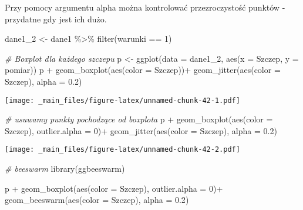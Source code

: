 \documentclass[
]{book}
\newenvironment{Shaded}{\begin{snugshade}}{\end{snugshade}}
\newcommand{\AttributeTok}[1]{\textcolor[rgb]{0.77,0.63,0.00}{#1}}
\newcommand{\CommentTok}[1]{\textcolor[rgb]{0.56,0.35,0.01}{\textit{#1}}}
\newcommand{\DecValTok}[1]{\textcolor[rgb]{0.00,0.00,0.81}{#1}}
\newcommand{\FloatTok}[1]{\textcolor[rgb]{0.00,0.00,0.81}{#1}}
\newcommand{\FunctionTok}[1]{\textcolor[rgb]{0.00,0.00,0.00}{#1}}
\newcommand{\NormalTok}[1]{#1}
\newcommand{\OtherTok}[1]{\textcolor[rgb]{0.56,0.35,0.01}{#1}}
\newcommand{\SpecialCharTok}[1]{\textcolor[rgb]{0.00,0.00,0.00}{#1}}
\begin{document}
Przy pomocy argumentu alpha można kontrolować przezroczystość punktów - przydatne gdy jest ich dużo.

\begin{Shaded}
\begin{Highlighting}[]
\NormalTok{dane1\_2 }\OtherTok{\textless{}{-}}\NormalTok{ dane1 }\SpecialCharTok{\%\textgreater{}\%} \FunctionTok{filter}\NormalTok{(warunki }\SpecialCharTok{==} \DecValTok{1}\NormalTok{)}

\CommentTok{\# Boxplot dla każdego szczepu}
\NormalTok{p }\OtherTok{\textless{}{-}} \FunctionTok{ggplot}\NormalTok{(}\AttributeTok{data =}\NormalTok{ dane1\_2, }\FunctionTok{aes}\NormalTok{(}\AttributeTok{x =}\NormalTok{ Szczep, }\AttributeTok{y =}\NormalTok{ pomiar))}
\NormalTok{p }\SpecialCharTok{+} \FunctionTok{geom\_boxplot}\NormalTok{(}\FunctionTok{aes}\NormalTok{(}\AttributeTok{color =}\NormalTok{ Szczep))}\SpecialCharTok{+}
  \FunctionTok{geom\_jitter}\NormalTok{(}\FunctionTok{aes}\NormalTok{(}\AttributeTok{color =}\NormalTok{ Szczep), }\AttributeTok{alpha =} \FloatTok{0.2}\NormalTok{)}
\end{Highlighting}
\end{Shaded}

\texttt{[image: \_main\_files/figure-latex/unnamed-chunk-42-1.pdf]}

\begin{Shaded}
\begin{Highlighting}[]
\CommentTok{\# usuwamy punkty pochodzące od boxplota}
\NormalTok{p }\SpecialCharTok{+} \FunctionTok{geom\_boxplot}\NormalTok{(}\FunctionTok{aes}\NormalTok{(}\AttributeTok{color =}\NormalTok{ Szczep), }\AttributeTok{outlier.alpha =} \DecValTok{0}\NormalTok{)}\SpecialCharTok{+}
  \FunctionTok{geom\_jitter}\NormalTok{(}\FunctionTok{aes}\NormalTok{(}\AttributeTok{color =}\NormalTok{ Szczep), }\AttributeTok{alpha =} \FloatTok{0.2}\NormalTok{)}
\end{Highlighting}
\end{Shaded}

\texttt{[image: \_main\_files/figure-latex/unnamed-chunk-42-2.pdf]}

\begin{Shaded}
\begin{Highlighting}[]
\CommentTok{\# beeswarm}
\FunctionTok{library}\NormalTok{(ggbeeswarm)}

\NormalTok{p }\SpecialCharTok{+} \FunctionTok{geom\_boxplot}\NormalTok{(}\FunctionTok{aes}\NormalTok{(}\AttributeTok{color =}\NormalTok{ Szczep), }\AttributeTok{outlier.alpha =} \DecValTok{0}\NormalTok{)}\SpecialCharTok{+}
  \FunctionTok{geom\_beeswarm}\NormalTok{(}\FunctionTok{aes}\NormalTok{(}\AttributeTok{color =}\NormalTok{ Szczep), }\AttributeTok{alpha =} \FloatTok{0.2}\NormalTok{)}
\end{Highlighting}
\end{Shaded}
\end{document}
